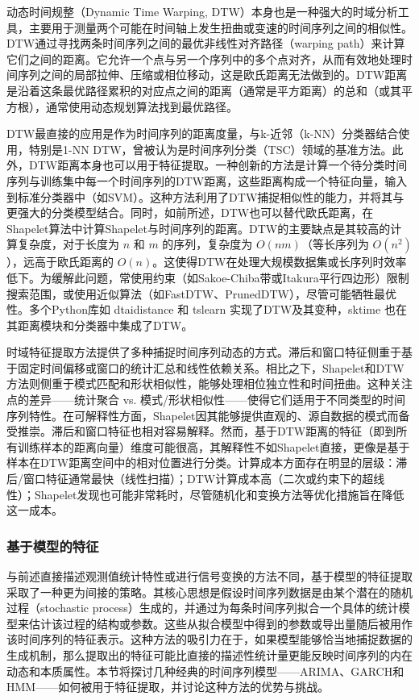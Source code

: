 动态时间规整（Dynamic Time Warping, DTW）本身也是一种强大的时域分析工具，主要用于测量两个可能在时间轴上发生扭曲或变速的时间序列之间的相似性。DTW通过寻找两条时间序列之间的最优非线性对齐路径（warping path）来计算它们之间的距离。它允许一个点与另一个序列中的多个点对齐，从而有效地处理时间序列之间的局部拉伸、压缩或相位移动，这是欧氏距离无法做到的。DTW距离是沿着这条最优路径累积的对应点之间的距离（通常是平方距离）的总和（或其平方根），通常使用动态规划算法找到最优路径。

DTW最直接的应用是作为时间序列的距离度量，与k-近邻（k-NN）分类器结合使用，特别是1-NN DTW，曾被认为是时间序列分类（TSC）领域的基准方法。此外，DTW距离本身也可以用于特征提取。一种创新的方法是计算一个待分类时间序列与训练集中每一个时间序列的DTW距离，这些距离构成一个特征向量，输入到标准分类器中（如SVM）。这种方法利用了DTW捕捉相似性的能力，并将其与更强大的分类模型结合。同时，如前所述，DTW也可以替代欧氏距离，在Shapelet算法中计算Shapelet与时间序列的距离。DTW的主要缺点是其较高的计算复杂度，对于长度为 $n$ 和 $m$ 的序列，复杂度为 $O(nm)$（等长序列为 $O(n^2)$），远高于欧氏距离的 $O(n)$。这使得DTW在处理大规模数据集或长序列时效率低下。为缓解此问题，常使用约束（如Sakoe-Chiba带或Itakura平行四边形）限制搜索范围，或使用近似算法（如FastDTW、PrunedDTW），尽管可能牺牲最优性。多个Python库如 dtaidistance 和 tslearn 实现了DTW及其变种，sktime 也在其距离模块和分类器中集成了DTW。

时域特征提取方法提供了多种捕捉时间序列动态的方式。滞后和窗口特征侧重于基于固定时间偏移或窗口的统计汇总和线性依赖关系。相比之下，Shapelet和DTW方法则侧重于模式匹配和形状相似性，能够处理相位独立性和时间扭曲。这种关注点的差异——统计聚合 vs. 模式/形状相似性——使得它们适用于不同类型的时间序列特性。在可解释性方面，Shapelet因其能够提供直观的、源自数据的模式而备受推崇。滞后和窗口特征也相对容易解释。然而，基于DTW距离的特征（即到所有训练样本的距离向量）维度可能很高，其解释性不如Shapelet直接，更像是基于样本在DTW距离空间中的相对位置进行分类。计算成本方面存在明显的层级：滞后/窗口特征通常最快（线性扫描）；DTW计算成本高（二次或约束下的超线性）；Shapelet发现也可能非常耗时，尽管随机化和变换方法等优化措施旨在降低这一成本。

\subsubsection{基于模型的特征}
与前述直接描述观测值统计特性或进行信号变换的方法不同，基于模型的特征提取采取了一种更为间接的策略。其核心思想是假设时间序列数据是由某个潜在的随机过程（stochastic process）生成的，并通过为每条时间序列拟合一个具体的统计模型来估计该过程的结构或参数。这些从拟合模型中得到的参数或导出量随后被用作该时间序列的特征表示。这种方法的吸引力在于，如果模型能够恰当地捕捉数据的生成机制，那么提取出的特征可能比直接的描述性统计量更能反映时间序列的内在动态和本质属性。本节将探讨几种经典的时间序列模型——ARIMA、GARCH和HMM——如何被用于特征提取，并讨论这种方法的优势与挑战。

